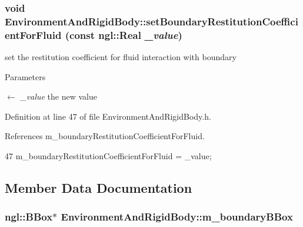 \hypertarget{class_environment_and_rigid_body_a1dd9536fc21a143341c904bc08f49f2b}{
\subsubsection[{setBoundaryRestitutionCoefficientForFluid}]{\setlength{\rightskip}{0pt plus 5cm}void EnvironmentAndRigidBody::setBoundaryRestitutionCoefficientForFluid (const ngl::Real {\em \_\-value})}}
\label{class_environment_and_rigid_body_a1dd9536fc21a143341c904bc08f49f2b}


set the restitution coefficient for fluid interaction with boundary 


\begin{DoxyParams}{Parameters}
\item[\mbox{$\leftarrow$} {\em \_\-value}]the new value \end{DoxyParams}


Definition at line 47 of file EnvironmentAndRigidBody.h.



References m\_\-boundaryRestitutionCoefficientForFluid.




\begin{DoxyCode}
47 { m_boundaryRestitutionCoefficientForFluid = _value; }
\end{DoxyCode}




\subsection{Member Data Documentation}
\hypertarget{class_environment_and_rigid_body_a59cc8a4afd1d9813b84261dc128b5a9f}{
\subsubsection[{m\_\-boundaryBBox}]{\setlength{\rightskip}{0pt plus 5cm}ngl::BBox$\ast$ {\bf EnvironmentAndRigidBody::m\_\-boundaryBBox}}}
\label{class_environment_and_rigid_body_a59cc8a4afd1d9813b84261dc128b5a9f}


